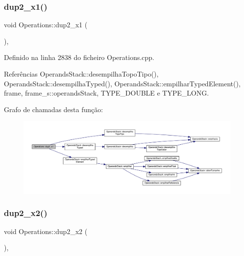 \subsubsection{\texorpdfstring{dup2\+\_\+x1()}{dup2\_x1()}}
{\footnotesize\ttfamily void Operations\+::dup2\+\_\+x1 (\begin{DoxyParamCaption}{ }\end{DoxyParamCaption})\hspace{0.3cm}{\ttfamily [static]}, {\ttfamily [private]}}



Definido na linha 2838 do ficheiro Operations.\+cpp.



Referências Operands\+Stack\+::desempilha\+Topo\+Tipo(), Operands\+Stack\+::desempilha\+Typed(), Operands\+Stack\+::empilhar\+Typed\+Element(), frame, frame\+\_\+s\+::operands\+Stack, T\+Y\+P\+E\+\_\+\+D\+O\+U\+B\+LE e T\+Y\+P\+E\+\_\+\+L\+O\+NG.

Grafo de chamadas desta função\+:\nopagebreak
\begin{figure}[H]
\begin{center}
\leavevmode
\includegraphics[width=350pt]{classOperations_a57b0cf4d7a133bf35b39fcf8d6e15511_cgraph}
\end{center}
\end{figure}
\mbox{\label{classOperations_ab49247b3958376b27e8347e053dfe7de}} 
\subsubsection{\texorpdfstring{dup2\+\_\+x2()}{dup2\_x2()}}
{\footnotesize\ttfamily void Operations\+::dup2\+\_\+x2 (\begin{DoxyParamCaption}{ }\end{DoxyParamCaption})\hspace{0.3cm}{\ttfamily [static]}, {\ttfamily [private]}}




